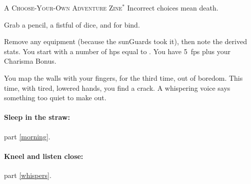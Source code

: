 \documentclass[10pt,twoside]{book}
\begin{document}
\frontmatter
{}

\begin{center}
  
  \par
  \vspace{3\baselineskip}
  {\Large\scshape A Choose-Your-Own Adventure Zine$^{*}$}
  \vfill\null
  \ast\tiny Incorrect choices mean death.
\end{center}

\pagebreak


\setcounter{page}{1}
\pagestyle{plain}
\small

\noindent
Grab a pencil, a fistful of dice, and  for \gls{bind}.

Remove any equipment (because the \glspl{sunGuard} took it), then note the derived stats.
You start with a number of \glspl{hp} equal to .
You have 5~\glspl{fp} plus your Charisma Bonus.


You map the walls with your fingers, for the third time, out of boredom.
This time, with tired, lowered hands, you find a crack.
A whispering voice says something too quiet to make out.

\paragraph{Sleep in the straw:}
part \vref{morning}.

\paragraph{Kneel and listen close:}
part \vref{whispers}.
\end{document}
